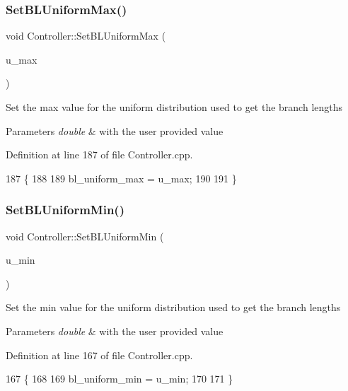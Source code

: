 \subsubsection{\texorpdfstring{Set\+B\+L\+Uniform\+Max()}{SetBLUniformMax()}}
{\footnotesize\ttfamily void Controller\+::\+Set\+B\+L\+Uniform\+Max (\begin{DoxyParamCaption}\item[{double}]{u\+\_\+max }\end{DoxyParamCaption})}

Set the max value for the uniform distribution used to get the branch lengths 
\begin{DoxyParams}{Parameters}
{\em double} & with the user provided value \\
\hline
\end{DoxyParams}


Definition at line 187 of file Controller.\+cpp.


\begin{DoxyCode}
187                                             \{
188   
189   bl\_uniform\_max = u\_max;
190   
191 \}
\end{DoxyCode}
\mbox{\label{classController_ab3b26fcf8f00ea5980bf7941dc24bb0b}} 
\subsubsection{\texorpdfstring{Set\+B\+L\+Uniform\+Min()}{SetBLUniformMin()}}
{\footnotesize\ttfamily void Controller\+::\+Set\+B\+L\+Uniform\+Min (\begin{DoxyParamCaption}\item[{double}]{u\+\_\+min }\end{DoxyParamCaption})}

Set the min value for the uniform distribution used to get the branch lengths 
\begin{DoxyParams}{Parameters}
{\em double} & with the user provided value \\
\hline
\end{DoxyParams}


Definition at line 167 of file Controller.\+cpp.


\begin{DoxyCode}
167                                             \{
168   
169   bl\_uniform\_min = u\_min;
170   
171 \}
\end{DoxyCode}
\mbox{\label{classController_aa122ac902c36eeb2889e12558d4ad087}} 
